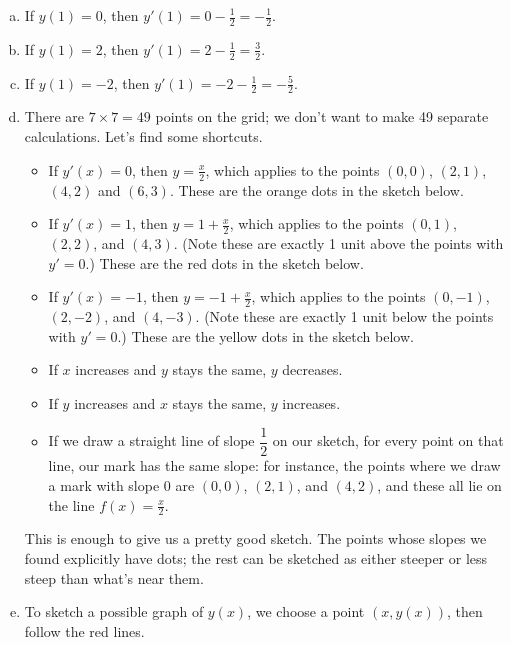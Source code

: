 \begin{solution}
\begin{enumerate}[(a)]
\item If $y(1)=0$, then $y'(1)=0-\frac{1}{2}=-\frac{1}{2}$.
\item If $y(1)=2$, then $y'(1)=2-\frac{1}{2}=\frac{3}{2}$.
\item If $y(1)=-2$, then $y'(1)=-2-\frac{1}{2}=-\frac{5}{2}$.
\item There are $7 \times 7 = 49$ points on the grid; we don't want to make 49 separate calculations. Let's find some shortcuts.
\begin{itemize}
\item If $y'(x)=0$, then $y=\frac{x}{2}$, which applies to the points $(0,0)$, $(2,1)$, $(4,2)$ and $(6,3)$. These are the orange dots in the sketch below.
\item If $y'(x)=1$, then $y=1+\frac{x}{2}$, which applies to the points $(0,1)$, $(2,2)$, and $(4,3)$. (Note these are exactly 1 unit above the points with $y'=0$.)
These are the red dots in the sketch below.
\item If $y'(x)=-1$, then $y=-1+\frac{x}{2}$, which applies to the points $(0,-1)$, $(2,-2)$, and $(4,-3)$. (Note these are exactly 1 unit below the points with $y'=0$.)
These are the yellow dots in the sketch below.
\item If $x$ increases and $y$ stays the same, $y$ decreases.
\item If $y$ increases and $x$ stays the same, $y$ increases.
\item If we draw a straight line of slope $\dfrac{1}{2}$ on our sketch, for every point on that line, our mark has the same slope: for instance, the points where we draw a mark with slope 0 are $(0,0)$, $(2,1)$, and $(4,2)$, and these all lie on the line $f(x)=\frac{x}{2}$.
\end{itemize}
This is enough to give us a pretty good sketch. The points whose slopes we found explicitly have dots; the rest can be sketched as either steeper or less steep than what's near them.
\begin{center}
\end{center}
\item To sketch a possible graph of $y(x)$, we choose a point $(x,y(x))$, then follow the red lines.


\end{enumerate}
\end{solution}
